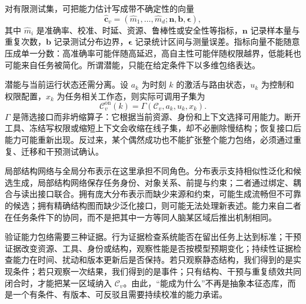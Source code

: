 对有限测试集，可把能力估计写成带不确定性的向量
\[
\widehat{\mathbf c}_v=
(\widehat m_1,\ldots,\widehat m_d;
\mathbf n,\mathbf b,\boldsymbol\epsilon),
\]
其中 $\widehat m_i$ 是准确率、校准、时延、资源、鲁棒性或安全性等指标，$\mathbf n$ 记录样本量与重复次数，$\mathbf b$ 记录测试分布边界，$\boldsymbol\epsilon$ 记录统计区间与测量误差。指标向量不能随意压成单一分数：高准确率可能伴随高延迟，高自主性可能伴随权限越界，低能耗也可能来自任务被简化。所谓潜能，只能在给定条件下以多维包络表达。

潜能与当前运行状态还需分离。设 $a_k$ 为时刻 $k$ 的激活与路由状态，$u_k$ 为控制和权限配置，$x_k$ 为任务相关工作态，则实际可调用子集为
\[
\mathcal C_v^{\mathrm{on}}(k)
=\Gamma(\mathcal C_v,a_k,u_k,x_k).
\]
$\Gamma$ 是筛选接口而非坍缩算子：它根据当前资源、身份和上下文选择可用能力。断开工具、冻结写权限或缩短上下文会收缩在线子集，却不必删除慢结构；恢复接口后能力可能重新出现。反过来，某个偶然成功也不能扩张整个能力包络，必须通过重复、迁移和干预测试确认。

局部结构网络与全局分布表示在这里承担不同角色。分布表示支持相似性泛化和候选生成，局部结构网络保存任务身份、对象关系、前提与约束；二者通过绑定、耦合与读出接口联合。拥有庞大分布表示而缺少来源和约束，可能生成流畅但不可靠的候选；拥有精确结构图而缺少泛化接口，则可能无法处理新表述。能力来自二者在任务条件下的协同，而不是把其中一方等同人脑某区域后推出机制相同。

验证能力包络需要三种证据。行为证据检查系统能否在留出任务上达到标准；干预证据改变资源、工具、身份或结构，观察性能是否按模型预期变化；持续性证据检查能力在时间、扰动和版本更新后是否保持。若只观察静态结构，我们得到的是实现条件；若只观察一次结果，我们得到的是事件；只有结构、干预与重复绩效共同闭合时，才能把某一区域纳入 $\mathcal C_v$。由此，“能成为什么”不再是抽象本征态库，而是一个有条件、有版本、可反驳且需要持续校准的能力承诺。

